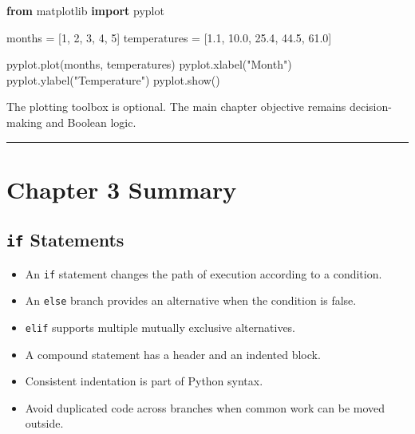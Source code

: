 \documentclass[
  11pt,
  a4paper,
]{article}
\newenvironment{Shaded}{}{}
\newcommand{\DecValTok}[1]{\textcolor[rgb]{0.25,0.63,0.44}{#1}}
\newcommand{\FloatTok}[1]{\textcolor[rgb]{0.25,0.63,0.44}{#1}}
\newcommand{\ImportTok}[1]{\textcolor[rgb]{0.00,0.50,0.00}{\textbf{#1}}}
\newcommand{\NormalTok}[1]{#1}
\newcommand{\OperatorTok}[1]{\textcolor[rgb]{0.40,0.40,0.40}{#1}}
\newcommand{\StringTok}[1]{\textcolor[rgb]{0.25,0.44,0.63}{#1}}
\providecommand{\tightlist}{%
  \setlength{\itemsep}{0pt}\setlength{\parskip}{0pt}}
\begin{document}
\begin{Shaded}
\begin{Highlighting}[]
\ImportTok{from}\NormalTok{ matplotlib }\ImportTok{import}\NormalTok{ pyplot}

\NormalTok{months }\OperatorTok{=}\NormalTok{ [}\DecValTok{1}\NormalTok{, }\DecValTok{2}\NormalTok{, }\DecValTok{3}\NormalTok{, }\DecValTok{4}\NormalTok{, }\DecValTok{5}\NormalTok{]}
\NormalTok{temperatures }\OperatorTok{=}\NormalTok{ [}\FloatTok{1.1}\NormalTok{, }\FloatTok{10.0}\NormalTok{, }\FloatTok{25.4}\NormalTok{, }\FloatTok{44.5}\NormalTok{, }\FloatTok{61.0}\NormalTok{]}

\NormalTok{pyplot.plot(months, temperatures)}
\NormalTok{pyplot.xlabel(}\StringTok{"Month"}\NormalTok{)}
\NormalTok{pyplot.ylabel(}\StringTok{"Temperature"}\NormalTok{)}
\NormalTok{pyplot.show()}
\end{Highlighting}
\end{Shaded}

The plotting toolbox is optional. The main chapter objective remains
decision-making and Boolean logic.

\begin{center}\rule{0.5\linewidth}{0.5pt}\end{center}

\section{Chapter 3 Summary}\label{chapter-3-summary}

\subsection{\texorpdfstring{\texttt{if}
Statements}{if Statements}}\label{if-statements}

\begin{itemize}
\tightlist
\item
  An \texttt{if} statement changes the path of execution according to a
  condition.
\item
  An \texttt{else} branch provides an alternative when the condition is
  false.
\item
  \texttt{elif} supports multiple mutually exclusive alternatives.
\item
  A compound statement has a header and an indented block.
\item
  Consistent indentation is part of Python syntax.
\item
  Avoid duplicated code across branches when common work can be moved
  outside.
\end{itemize}
\end{document}
